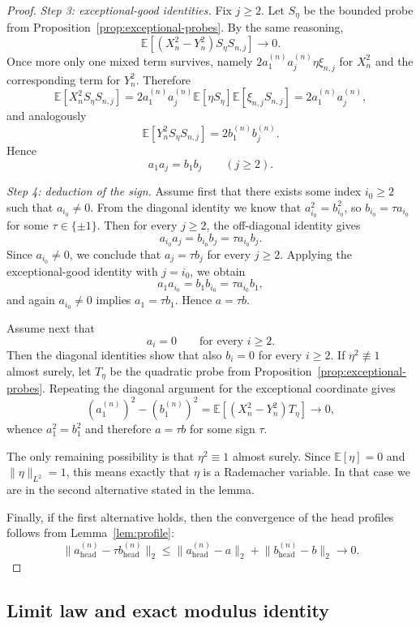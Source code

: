\documentclass[11pt]{amsart}
\numberwithin{equation}{section}
\theoremstyle{definition}
\theoremstyle{remark}
\newcommand{\E}{\mathbb E}
\newcommand{\norm}[1]{\lVert #1 \rVert}
\begin{document}
\begin{proof}
\smallskip
\noindent\emph{Step 3: exceptional-good identities.}
Fix $j\ge2$.  Let $S_\eta$ be the bounded probe from
Proposition~\ref{prop:exceptional-probes}.  By the same reasoning,
\[
\E[(X_n^2-Y_n^2)S_\eta S_{n,j}]\longrightarrow0.
\]
Once more only one mixed term survives, namely
$2a_1^{(n)}a_j^{(n)}\eta\xi_{n,j}$ for $X_n^2$ and the corresponding term for
$Y_n^2$.  Therefore
\[
\E[X_n^2S_\eta S_{n,j}]
=2a_1^{(n)}a_j^{(n)}\E[\eta S_\eta]\E[\xi_{n,j}S_{n,j}]
=2a_1^{(n)}a_j^{(n)},
\]
and analogously
\[
\E[Y_n^2S_\eta S_{n,j}]
=2b_1^{(n)}b_j^{(n)}.
\]
Hence
\[
a_1a_j=b_1b_j
\qquad(j\ge2).
\]

\smallskip
\noindent\emph{Step 4: deduction of the sign.}
Assume first that there exists some index $i_0\ge2$ such that $a_{i_0}\ne0$.
From the diagonal identity we know that
$a_{i_0}^2=b_{i_0}^2$, so $b_{i_0}=\tau a_{i_0}$ for some
$\tau\in\{\pm1\}$.  Then for every $j\ge2$, the off-diagonal identity gives
\[
a_{i_0}a_j=b_{i_0}b_j=\tau a_{i_0}b_j.
\]
Since $a_{i_0}\ne0$, we conclude that $a_j=\tau b_j$ for every $j\ge2$.
Applying the exceptional-good identity with $j=i_0$, we obtain
\[
a_1a_{i_0}=b_1b_{i_0}=\tau a_{i_0}b_1,
\]
and again $a_{i_0}\ne0$ implies $a_1=\tau b_1$.  Hence $a=\tau b$.

Assume next that
\[
a_i=0
\qquad\text{for every }i\ge2.
\]
Then the diagonal identities show that also $b_i=0$ for every $i\ge2$.
If $\eta^2\not\equiv1$ almost surely, let $T_\eta$ be the quadratic probe from
Proposition~\ref{prop:exceptional-probes}.  Repeating the diagonal argument for
the exceptional coordinate gives
\[
(a_1^{(n)})^2-(b_1^{(n)})^2
=\E[(X_n^2-Y_n^2)T_\eta]
\longrightarrow0,
\]
whence $a_1^2=b_1^2$ and therefore $a=\tau b$ for some sign $\tau$.

The only remaining possibility is that $\eta^2\equiv1$ almost surely.  Since
$\E[\eta]=0$ and $\norm{\eta}_{L^2}=1$, this means exactly that $\eta$ is a
Rademacher variable.  In that case we are in the second alternative stated in
the lemma.

Finally, if the first alternative holds, then the convergence of the head
profiles follows from Lemma~\ref{lem:profile}:
\[
\norm{a_{\mathrm{head}}^{(n)}-\tau b_{\mathrm{head}}^{(n)}}_2
\le
\norm{a_{\mathrm{head}}^{(n)}-a}_2
+
\norm{b_{\mathrm{head}}^{(n)}-b}_2
\longrightarrow0.
\]
\end{proof}

\subsection{Limit law and exact modulus identity}
\end{document}
